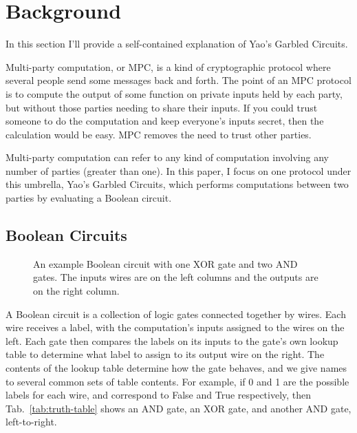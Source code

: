 \section{Background}

In this section I'll provide a self-contained explanation of Yao's Garbled Circuits.

Multi-party computation, or MPC, is a kind of cryptographic protocol where several people send some messages back and forth. The point of an MPC protocol is to compute the output of some function on private inputs held by each party, but without those parties needing to share their inputs. If you could trust someone to do the computation and keep everyone's inputs secret, then the calculation would be easy. MPC removes the need to trust other parties.

Multi-party computation can refer to any kind of computation involving any number of parties (greater than one). In this paper, I focus on one protocol under this umbrella, Yao's Garbled Circuits, which performs computations between two parties by evaluating a Boolean circuit.

\subsection{Boolean Circuits}

\begin{figure}[b]
	\centering
	\caption{An example Boolean circuit with one XOR gate and two AND gates. The inputs wires are on the left columns and the outputs are on the right column.}%
	\label{fig:circuit}
\end{figure}

A Boolean circuit is a collection of logic gates connected together by wires. Each wire receives a label, with the computation's inputs assigned to the wires on the left. Each gate then compares the labels on its inputs to the gate's own lookup table to determine what label to assign to its output wire on the right. The contents of the lookup table determine how the gate behaves, and we give names to several common sets of table contents. For example, if 0 and 1 are the possible labels for each wire, and correspond to False and True respectively, then Tab.~\ref{tab:truth-table} shows an AND gate, an XOR gate, and another AND gate, left-to-right.

